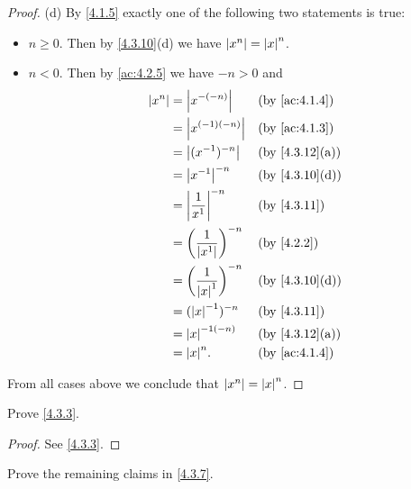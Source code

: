 \begin{proof}{(d)}
  By \cref{4.1.5} exactly one of the following two statements is true:
  \begin{itemize}
    \item \(n \geq 0\).
          Then by \cref{4.3.10}(d) we have \(\left\lvert x^n\right\rvert = \left\lvert x\right\rvert^n\).
    \item \(n < 0\).
          Then by \cref{ac:4.2.5} we have \(-n > 0\) and
          \begin{align*}
            \abs{x^n} & = \abs{x^{-(-n)}}                       &  & \text{(by \cref{ac:4.1.4})}  \\
                      & = \abs{x^{(-1)(-n)}}                    &  & \text{(by \cref{ac:4.1.3})}  \\
                      & = \abs{(x^{-1})^{-n}}                   &  & \text{(by \cref{4.3.12}(a))} \\
                      & = \abs{x^{-1}}^{-n}                     &  & \text{(by \cref{4.3.10}(d))} \\
                      & = \abs{\dfrac{1}{x^1}}^{-n}             &  & \text{(by \cref{4.3.11})}    \\
                      & = \bigg(\dfrac{1}{\abs{x^1}}\bigg)^{-n} &  & \text{(by \cref{4.2.2})}     \\
                      & = \bigg(\dfrac{1}{\abs{x}^1}\bigg)^{-n} &  & \text{(by \cref{4.3.10}(d))} \\
                      & = (\abs{x}^{-1})^{-n}                   &  & \text{(by \cref{4.3.11})}    \\
                      & = \abs{x}^{-1(-n)}                      &  & \text{(by \cref{4.3.12}(a))} \\
                      & = \abs{x}^n.                            &  & \text{(by \cref{ac:4.1.4})}
          \end{align*}
  \end{itemize}
  From all cases above we conclude that \(\left\lvert x^n\right\rvert = \left\lvert x\right\rvert^n\).
\end{proof}

\exercisesection

\begin{ex}\label{ex:4.3.1}
  Prove \cref{4.3.3}.
\end{ex}

\begin{proof}
  See \cref{4.3.3}.
\end{proof}

\begin{ex}\label{ex:4.3.2}
  Prove the remaining claims in \cref{4.3.7}.
\end{ex}

